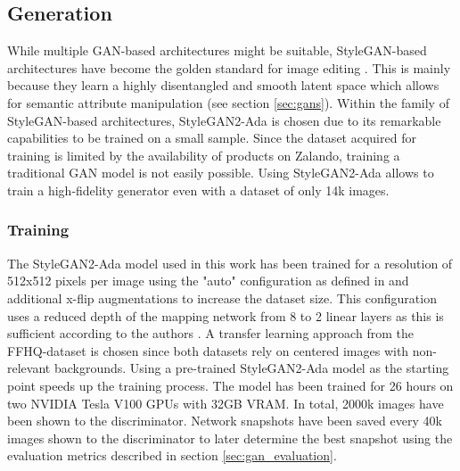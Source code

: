 \subsection{Generation}
While multiple GAN-based architectures might be suitable, StyleGAN-based architectures have become the golden standard for image editing \citep[p.1]{bermano2022state}. This is mainly because they learn a highly disentangled and smooth latent space which allows for semantic attribute manipulation (see section \ref{sec:gans}). Within the family of StyleGAN-based architectures, StyleGAN2-Ada \citep{stylegan2ada} is chosen due to its remarkable capabilities to be trained on a small sample. Since the dataset acquired for training is limited by the availability of products on Zalando, training a traditional GAN model is not easily possible. Using StyleGAN2-Ada allows to train a high-fidelity generator even with a dataset of only 14k images.

\subsubsection{Training} \label{sec:sg2_training}
The StyleGAN2-Ada model used in this work has been trained for a resolution of 512x512 pixels per image using the "auto" configuration as defined in \cite{stylegan2ada} and additional x-flip augmentations to increase the dataset size. This configuration uses a reduced depth of the mapping network from 8 to 2 linear layers as this is sufficient according to the authors \citep[Appendix p.35]{stylegan2}. A transfer learning approach from the FFHQ-dataset \citep{stylegan1} is chosen since both datasets rely on centered images with non-relevant backgrounds. Using a pre-trained StyleGAN2-Ada model as the starting point speeds up the training process. The model has been trained for 26 hours on two NVIDIA Tesla V100 GPUs with 32GB VRAM. In total, 2000k images have been shown to the discriminator. Network snapshots have been saved every 40k images shown to the discriminator to later determine the best snapshot using the evaluation metrics described in section \ref{sec:gan_evaluation}.

